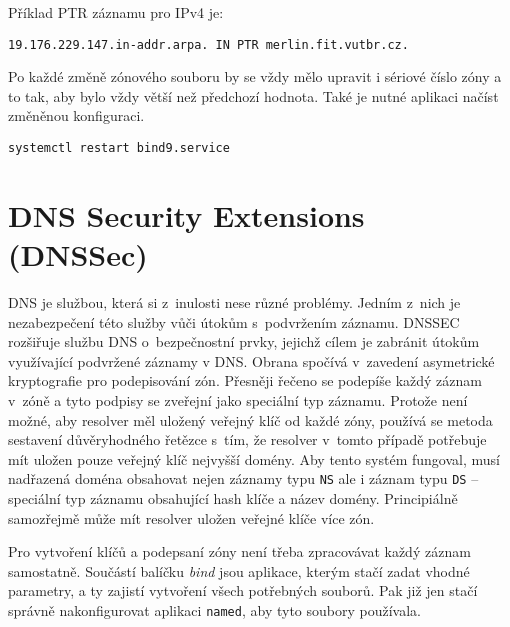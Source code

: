 Příklad PTR záznamu pro IPv4 je:
\begin{verbatim}
19.176.229.147.in-addr.arpa. IN	PTR	merlin.fit.vutbr.cz.
\end{verbatim}

Po každé změně zónového souboru by se vždy mělo upravit i sériové číslo zóny a to tak, aby bylo vždy větší než předchozí hodnota. Také je nutné aplikaci načíst změněnou konfiguraci.
\begin{verbatim}
systemctl restart bind9.service
\end{verbatim}


\section{DNS Security Extensions (DNSSec)}
\label{dnssec}

DNS je službou, která si z~inulosti nese různé problémy. Jedním z~nich je
nezabezpečení této služby vůči útokům s~podvržením záznamu.
DNSSEC rozšiřuje službu DNS o~bezpečnostní prvky, jejichž cílem je zabránit
útokům využívající podvržené záznamy v DNS. Obrana spočívá v~zavedení
asymetrické kryptografie pro podepisování zón. Přesněji řečeno se podepíše každý
záznam v~zóně a tyto podpisy se zveřejní jako speciální typ záznamu. Protože není možné, aby resolver měl uložený veřejný klíč od každé zóny, používá se metoda sestavení důvěryhodného řetězce s~tím, že resolver v~tomto případě potřebuje mít uložen pouze veřejný klíč nejvyšší domény. Aby tento systém fungoval, musí nadřazená doména obsahovat nejen záznamy typu {\tt NS} ale i záznam typu {\tt DS} -- speciální typ záznamu obsahující hash klíče a název domény. Principiálně samozřejmě může mít resolver uložen veřejné klíče více zón.

Pro vytvoření klíčů a podepsaní zóny není třeba zpracovávat každý záznam samostatně. Součástí balíčku {\em bind} jsou aplikace, kterým stačí zadat vhodné parametry, a ty zajistí vytvoření všech potřebných souborů. Pak již jen stačí správně nakonfigurovat aplikaci {\tt named}, aby tyto soubory používala.

